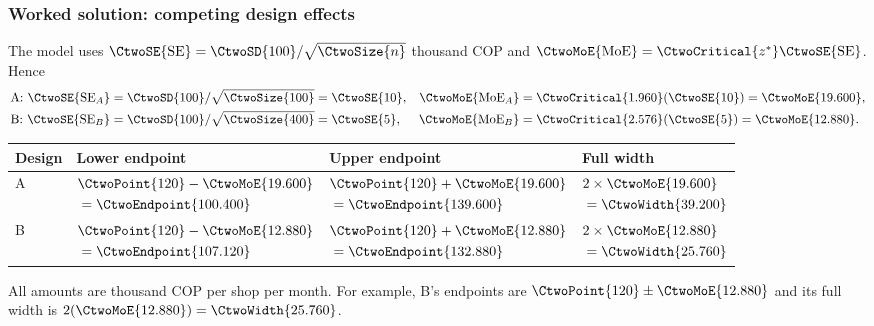 \subsubsection*{Worked solution: competing design effects}\label{sol:c3-3}
The model uses $\CtwoSE{\mathrm{SE}}=\CtwoSD{100}/\sqrt{\CtwoSize{n}}$ thousand COP and $\CtwoMoE{\mathrm{MoE}}=\CtwoCritical{z^*}\CtwoSE{\mathrm{SE}}$. Hence
\begin{align*}
\text{A: }\CtwoSE{\mathrm{SE}_A}&=\CtwoSD{100}/\sqrt{\CtwoSize{100}}=\CtwoSE{10},&
\CtwoMoE{\mathrm{MoE}_A}&=\CtwoCritical{1.960}(\CtwoSE{10})=\CtwoMoE{19.600},\\
\text{B: }\CtwoSE{\mathrm{SE}_B}&=\CtwoSD{100}/\sqrt{\CtwoSize{400}}=\CtwoSE{5},&
\CtwoMoE{\mathrm{MoE}_B}&=\CtwoCritical{2.576}(\CtwoSE{5})=\CtwoMoE{12.880}.
\end{align*}
\begin{center}\begin{tabular}{@{}llll@{}}\toprule
Design & Lower endpoint & Upper endpoint & Full width\\\midrule
A & $\begin{aligned}[t]&\CtwoPoint{120}-\CtwoMoE{19.600}\\ &= \CtwoEndpoint{100.400}\end{aligned}$ & $\begin{aligned}[t]&\CtwoPoint{120}+\CtwoMoE{19.600}\\ &= \CtwoEndpoint{139.600}\end{aligned}$ & $\begin{aligned}[t]&2\times\CtwoMoE{19.600}\\ &= \CtwoWidth{39.200}\end{aligned}$\\[3pt]
B & $\begin{aligned}[t]&\CtwoPoint{120}-\CtwoMoE{12.880}\\ &= \CtwoEndpoint{107.120}\end{aligned}$ & $\begin{aligned}[t]&\CtwoPoint{120}+\CtwoMoE{12.880}\\ &= \CtwoEndpoint{132.880}\end{aligned}$ & $\begin{aligned}[t]&2\times\CtwoMoE{12.880}\\ &= \CtwoWidth{25.760}\end{aligned}$\\\bottomrule
\end{tabular}\end{center}
All amounts are thousand COP per shop per month. For example, B's endpoints are $\CtwoPoint{120}\pm\CtwoMoE{12.880}$ and its full width is $2(\CtwoMoE{12.880})=\CtwoWidth{25.760}$.
